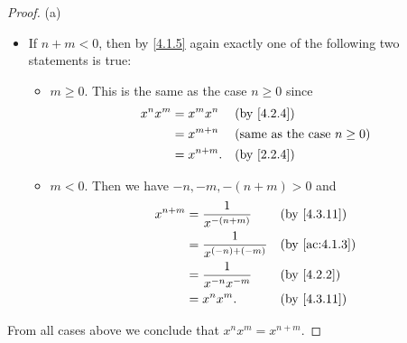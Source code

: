 \begin{proof}{(a)}
\begin{itemize}
\begin{itemize}
            \item If \(n + m < 0\), then by \cref{4.1.5} again exactly one of the following two statements is true:
                  \begin{itemize}
                    \item \(m \geq 0\).
                          This is the same as the case \(n \geq 0\) since
                          \begin{align*}
                            x^n x^m & = x^m x^n    &  & \text{(by \cref{4.2.4})}               \\
                                    & = x^{m + n}  &  & \text{(same as the case \(n \geq 0\))} \\
                                    & = x^{n + m}. &  & \text{(by \cref{2.2.4})}
                          \end{align*}
                    \item \(m < 0\).
                          Then we have \(-n, -m, -(n + m) > 0\) and
                          \begin{align*}
                            x^{n + m} & = \dfrac{1}{x^{-(n + m)}}    &  & \text{(by \cref{4.3.11})}   \\
                                      & = \dfrac{1}{x^{(-n) + (-m)}} &  & \text{(by \cref{ac:4.1.3})} \\
                                      & = \dfrac{1}{x^{-n} x^{-m}}   &  & \text{(by \cref{4.2.2})}    \\
                                      & = x^n x^m.                   &  & \text{(by \cref{4.3.11})}
                          \end{align*}
                  \end{itemize}
          \end{itemize}
  \end{itemize}
  From all cases above we conclude that \(x^n x^m = x^{n + m}\).


\end{proof}
